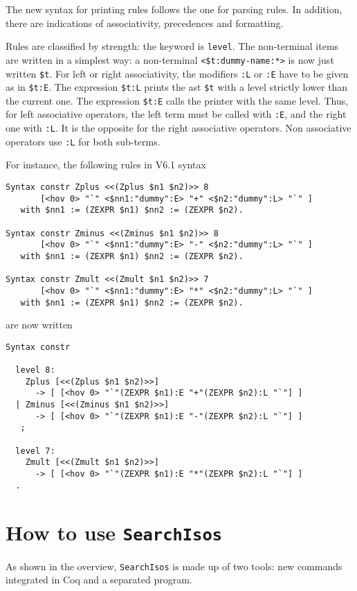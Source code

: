\documentclass[11pt]{article}
\begin{document}
\begin{coq_example*}
The new syntax for printing rules follows the one for parsing rules. In
addition, there are indications of associativity, precedences and
formatting.

Rules are classified by strength: the keyword is \verb-level-. The
non-terminal items are written in a simplest way: a non-terminal
\verb!<$t:dummy-name:*>! is now just written \verb!$t!. For left or
right associativity, the modifiers \verb!:L! or 
 \verb!:E! have to be given as in  \verb!$t:E!. The expression \verb!$t:L! prints the
ast \verb!$t! with a level strictly lower than the current one.
The expression \verb!$t:E! calls the printer with the same level. Thus, for left
associative operators, the left term must be called with \verb!:E!, and the
right one with \verb!:L!. It is the opposite for the right associative
operators. Non associative operators use \verb!:L! for both sub-terms.

For instance, the following rules in V6.1 syntax

\begin{verbatim}
Syntax constr Zplus <<(Zplus $n1 $n2)>> 8
       [<hov 0> "`" <$nn1:"dummy":E> "+" <$n2:"dummy":L> "`" ]
   with $nn1 := (ZEXPR $n1) $nn2 := (ZEXPR $n2).

Syntax constr Zminus <<(Zminus $n1 $n2)>> 8
       [<hov 0> "`" <$nn1:"dummy":E> "-" <$n2:"dummy":L> "`" ]
   with $nn1 := (ZEXPR $n1) $nn2 := (ZEXPR $n2).

Syntax constr Zmult <<(Zmult $n1 $n2)>> 7
       [<hov 0> "`" <$nn1:"dummy":E> "*" <$n2:"dummy":L> "`" ]
   with $nn1 := (ZEXPR $n1) $nn2 := (ZEXPR $n2).
\end{verbatim}
are now written
\begin{verbatim}
Syntax constr

  level 8:
    Zplus [<<(Zplus $n1 $n2)>>]
      -> [ [<hov 0> "`"(ZEXPR $n1):E "+"(ZEXPR $n2):L "`"] ]
  | Zminus [<<(Zminus $n1 $n2)>>]
      -> [ [<hov 0> "`"(ZEXPR $n1):E "-"(ZEXPR $n2):L "`"] ]
   ;

  level 7:
    Zmult [<<(Zmult $n1 $n2)>>]
      -> [ [<hov 0> "`"(ZEXPR $n1):E "*"(ZEXPR $n2):L "`"] ]
  .
\end{verbatim}

\section{How to use \texttt{SearchIsos}}

As shown in the overview, \texttt{SearchIsos} is made up of two tools: new
commands integrated in Coq and a separated program.


\end{coq_example*}
\end{document}
